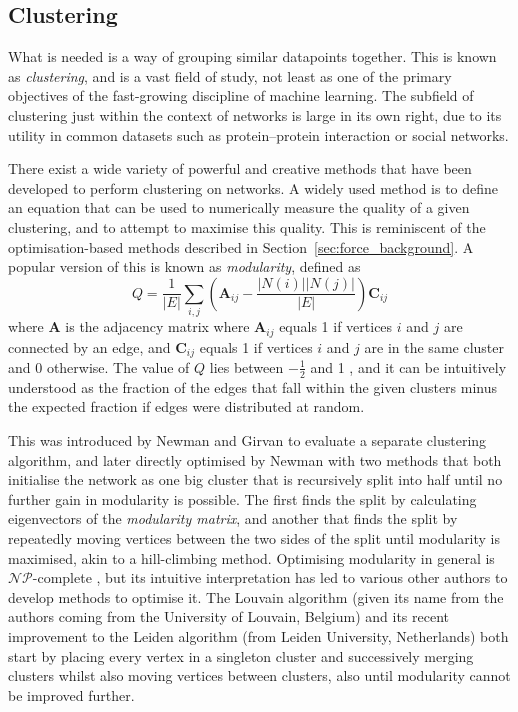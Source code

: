 \subsection{Clustering}
What is needed is a way of grouping similar datapoints together. This is known as \textit{clustering}, and is a vast field of study, not least as one of the primary objectives of the fast-growing discipline of machine learning. The subfield of clustering just within the context of networks is large in its own right, due to its utility in common datasets such as protein--protein interaction or social networks.

There exist a wide variety of powerful and creative methods that have been developed to perform clustering on networks. A widely used method is to define an equation that can be used to numerically measure the quality of a given clustering, and to attempt to maximise this quality. This is reminiscent of the optimisation-based methods described in Section~\ref{sec:force_background}.
A popular version of this is known as \emph{modularity}, defined as
\begin{equation}
Q = \frac{1}{|E|}\sum_{i,j}\left(\mathbf{A}_{ij} - \frac{|N(i)||N(j)|}{|E|}\right)\mathbf{C}_{ij}
\label{eq:modularity}
\end{equation}
where $\mathbf{A}$ is the adjacency matrix where $\mathbf{A}_{ij}$ equals 1 if vertices $i$ and $j$ are connected by an edge, and $\mathbf{C}_{ij}$ equals 1 if vertices $i$ and $j$ are in the same cluster and 0 otherwise.
The value of $Q$ lies between $-\frac{1}{2}$ and 1 \cite{Brandes2007a}, and it can be intuitively understood as the fraction of the edges that fall within the given clusters minus the expected fraction if edges were distributed at random.

This was introduced by Newman and Girvan \cite{Newman2004} to evaluate a separate clustering algorithm, and later directly optimised by Newman \cite{Newman2006} with two methods that both initialise the network as one big cluster that is recursively split into half until no further gain in modularity is possible. The first finds the split by calculating eigenvectors of the \emph{modularity matrix}, and another that finds the split by repeatedly moving vertices between the two sides of the split until modularity is maximised, akin to a hill-climbing method.
Optimising modularity in general is $\mathcal{NP}$-complete \cite{Brandes2007a}, but its intuitive interpretation has led to various other authors to develop methods to optimise it. The Louvain algorithm (given its name from the authors coming from the University of Louvain, Belgium) \cite{Blondel2008} and its recent improvement to the Leiden algorithm (from Leiden University, Netherlands) \cite{Traag2019} both start by placing every vertex in a singleton cluster and successively merging clusters whilst also moving vertices between clusters, also until modularity cannot be improved further.

